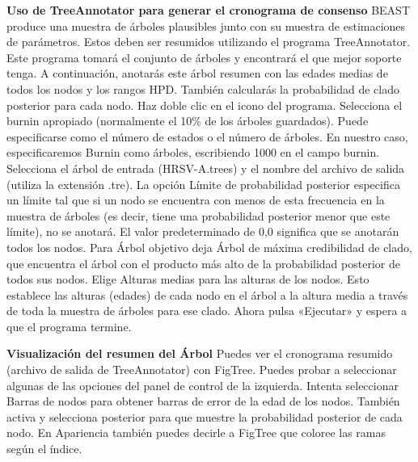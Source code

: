 \textbf{Uso de TreeAnnotator para generar el cronograma de consenso}
BEAST produce una muestra de árboles plausibles junto con su muestra de estimaciones de parámetros. Estos deben ser resumidos utilizando el programa TreeAnnotator. Este programa tomará el conjunto de árboles y encontrará el que mejor soporte tenga. A continuación, anotarás este árbol resumen con las edades medias de todos los nodos y los rangos HPD. También calcularás la probabilidad de clado posterior para cada nodo. Haz doble clic en el icono del programa. Selecciona el burnin apropiado (normalmente el 10\% de los árboles guardados). Puede especificarse como el número de estados o el número de árboles. En nuestro caso, especificaremos Burnin como árboles, escribiendo 1000 en el campo burnin. Selecciona el árbol de entrada (HRSV-A.trees) y el nombre del archivo de salida (utiliza la extensión .tre). La opción Límite de probabilidad posterior especifica un límite tal que si un nodo se encuentra con menos de esta frecuencia en la muestra de árboles (es decir, tiene una probabilidad posterior menor que este límite), no se anotará. El valor predeterminado de 0,0 significa que se anotarán todos los nodos. Para Árbol objetivo deja Árbol de máxima credibilidad de clado, que encuentra el árbol con el producto más alto de la probabilidad posterior de todos sus nodos. Elige Alturas medias para las alturas de los nodos. Esto establece las alturas (edades) de cada nodo en el árbol a la altura media a través de toda la muestra de árboles para ese clado. Ahora pulsa «Ejecutar» y espera a que el programa termine.

\textbf{Visualización del resumen del Árbol}
Puedes ver el cronograma resumido (archivo de salida de TreeAnnotator) con FigTree. Puedes probar a seleccionar algunas de las opciones del panel de control de la izquierda. Intenta seleccionar Barras de nodos para obtener barras de error de la edad de los nodos. También activa y selecciona posterior para que muestre la probabilidad posterior de cada nodo. En Apariencia también puedes decirle a FigTree que coloree las ramas según el índice.